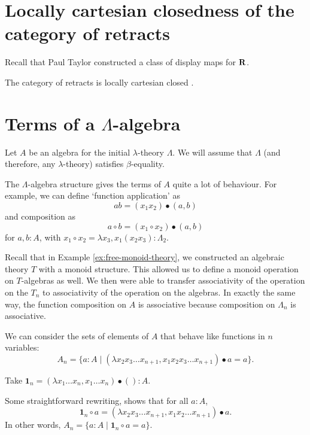 \section{Locally cartesian closedness of the category of retracts}

Recall that Paul Taylor constructed a class of display maps for $ \mathbf{R} $.


\begin{theorem}
  The category of retracts is locally cartesian closed \TODO.
\end{theorem}

\section{Terms of a \texorpdfstring{$ \Lambda $}{Lambda}-algebra}
Let $ A $ be an algebra for the initial $ \lambda $-theory $ \Lambda $. We will assume that $ \Lambda $ (and therefore, any $ \lambda $-theory) satisfies $ \beta $-equality.

The $ \Lambda $-algebra structure gives the terms of $ A $ quite a lot of behaviour. For example, we can define `function application' as
\[ a b = (x_1 x_2) \bullet (a, b) \]
and composition as
\[ a \circ b = (x_1 \circ x_2) \bullet (a, b) \]
for $ a, b : A $, with $ x_1 \circ x_2 = \lambda x_3, x_1 (x_2 x_3) : \Lambda_2 $.

\begin{remark}
  Recall that in Example \ref{ex:free-monoid-theory}, we constructed an algebraic theory $ T $ with a monoid structure. This allowed us to define a monoid operation on $ T $-algebras as well. We then were able to transfer associativity of the operation on the $ T_n $ to associativity of the operation on the algebras. In exactly the same way, the function composition on $ A $ is associative because composition on $ \Lambda_n $ is associative.
\end{remark}

\begin{definition}
  We can consider the sets of elements of $ A $ that behave like functions in $ n $ variables:
  \[ A_n = \{ a : A \mid (\lambda x_2 x_3 \dots x_{n + 1}, x_1 x_2 x_3 \dots x_{n + 1}) \bullet a = a \}. \]
\end{definition}

\begin{definition}
  Take $ \mathbf 1_n = (\lambda x_1 \dots x_n, x_1 \dots x_n) \bullet () : A $.
\end{definition}

\begin{remark}
  Some straightforward rewriting, shows that for all $ a : A $,
  \[ \mathbf 1_n \circ a = (\lambda x_2 x_3 \dots x_{n + 1}, x_1 x_2 \dots x_{n + 1}) \bullet a. \]
  In other words, $ A_n = \{ a : A \mid \mathbf 1_n \circ a = a \} $.
\end{remark}

